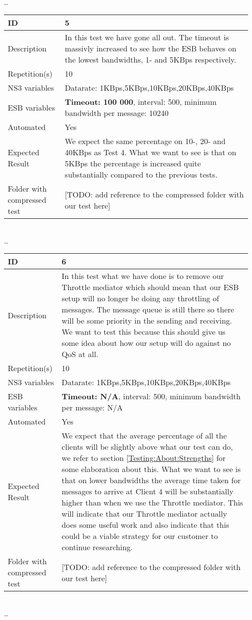 \begin{center}
\\ \ldots \\

\begin{tabular}{| p{4cm} | p{8cm} |}%
	\hline
	ID & 5 \\
	\hline
	Description & In this test we have gone all out. The timeout is massivly increased to see how the ESB behaves on the lowest bandwidths, 1- and 5KBps respectively.  \\
	\hline
	Repetition(s) & 10 \\
	\hline
	NS3 variables & Datarate: 1KBps,5KBps,10KBps,20KBps,40KBps \\
	\hline
	ESB variables & \textbf{Timeout: 100 000}, interval: 500, minimum bandwidth per message: 10240 \\
	\hline
	Automated & Yes \\
	\hline
	Expected Result & We expect the same percentage on 10-, 20- and 40KBps as Test 4. What we want to see is that on 5KBps the percentage is increased quite substantially compared to the previous tests. \\
	\hline
	Folder with compressed test & [TODO: add reference to the compressed folder with our test here]\\
	\hline
\end{tabular}
\\ \ldots \\
\begin{tabular}{| p{4cm} | p{8cm} |}%
	\hline
	ID & 6 \\
	\hline
	Description & In this test what we have done is to remove our Throttle mediator which should mean that our ESB setup will no longer be doing any throttling of messages. The message queue is still there so there will be some priority in the sending and receiving. We want to test this because this should give us some idea about how our setup will do against no QoS at all. \\
	\hline
	Repetition(s) & 10 \\
	\hline
	NS3 variables & Datarate: 1KBps,5KBps,10KBps,20KBps,40KBps \\
	\hline
	ESB variables & \textbf{Timeout: N/A}, interval: 500, minimum bandwidth per message: N/A \\
	\hline
	Automated & Yes \\
	\hline
	Expected Result & We expect that the average percentage of all the clients will be slightly above what our test can do, we refer to section \ref{Testing:About:Strengths} for some elaboration about this. What we want to see is that on lower bandwidths the average time taken for messages to arrive at Client 4 will be substantially higher than when we use the Throttle mediator. This will indicate that our Throttle mediator actually does some useful work and also indicate that this could be a viable strategy for our customer to continue researching. \\
	\hline
	Folder with compressed test & [TODO: add reference to the compressed folder with our test here]\\
	\hline
\end{tabular}

\\ \ldots \\

\end{center}
